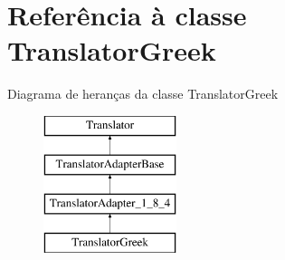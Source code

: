 \hypertarget{class_translator_greek}{\section{Referência à classe Translator\-Greek}
\label{class_translator_greek}
}
Diagrama de heranças da classe Translator\-Greek\begin{figure}[H]
\begin{center}
\leavevmode
\includegraphics[height=4.000000cm]{class_translator_greek}
\end{center}
\end{figure}
